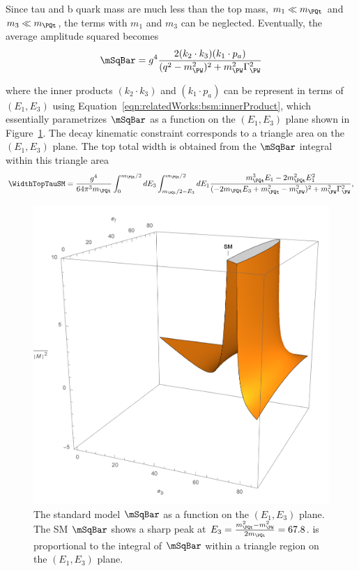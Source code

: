 \noindent Since tau and b quark mass are much less than the top mass, $m_1 \ll m_\PQt $ and $m_3 \ll m_\PQt$, the terms with $m_1$ and $m_3$ can be neglected. Eventually, the average amplitude squared becomes
\begin{equation}
	\mSqBar =  g^4 \frac{2  (  k_2 \cdot k_3) (  k_1 \cdot p_a) }{ (  q^2-m^2_{\PW})^2 +  m^2_{\PW} \Gamma^2_{\PW} }  
    \label{eqn:relatedWorks:bsm:smTopDecay:smTopDecay:m2}
\end{equation}

\noindent where the inner products $(  k_2 \cdot k_3)$ and $ (  k_1 \cdot p_a) $ can be represent in terms of $(E_1,E_3)$ using Equation~\ref{eqn:relatedWorks:bsm:innerProduct}, which essentially parametrizes $\mSqBar $ as a function on the $(E_1,E_3)$ plane shown in Figure~\ref{fig:relatedWorks:bsm:smTopDecay:smM2}. The decay kinematic constraint corresponds to a triangle area on the  $(E_1,E_3)$ plane. The top total width is obtained from the $\mSqBar $ integral within this triangle area
\begin{equation}
    \begin{split}
         \WidthTopTauSM = \frac{g^4}{64 \pi^3 m_\PQt} \int_{0}^{m_\PQt/2} d E_3 \int_{m_\PQt/2-E_3}^{m_\PQt/2} d E_1 \frac{m_\PQt^3 E_1 - 2 m_\PQt^2 E_1^2}{(-2 m_\PQt E_3  + m_\PQt^2  -m_\PW^2)^2 + m^2_{\PW} \Gamma^2_{\PW}},
    \end{split}
\end{equation}



\begin{figure}
\centering
    \includegraphics[width=0.4 \textwidth]{chapters/RelatedWorks/sectionBSM/figures/SM.png}
    \caption{The standard model $\mSqBar $ as a function on the $(E_1,E_3)$ plane. The SM $\mSqBar $  shows a sharp peak at $E_3 = \frac{m^2_\PQt - m^2_{\PW}}{2 m_\PQt} = 67.8 $\GeV. \WidthTopTauSM is proportional to the integral of $\mSqBar $ within a triangle region on the $(E_1,E_3)$ plane. }
    \label{fig:relatedWorks:bsm:smTopDecay:smM2}
\end{figure}







